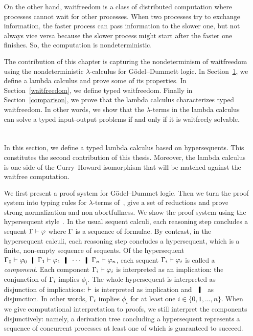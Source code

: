 On the other hand, waitfreedom is a class of distributed computation
where processes cannot wait for other processes.  When two processes try
to exchange information, the faster process can pass information to the
slower one, but not always vice versa because the slower process might
start after the faster one finishes.
So, the computation is nondeterministic.

The contribution of this chapter is capturing
the nondeterminism of waitfreedom using the nondeterministic
$\lambda$-calculus for G\"odel--Dummett logic.
In Section~\ref{lgd},
we define a lambda calculus and prove some of its properties.
In Section~\ref{waitfreedom}, we define typed waitfreedom.
Finally in Section~\ref{comparison},
we prove that the lambda calculus characterizes typed waitfreedom.
In other words, we show that the
$\lambda$-terms in the lambda calculus can solve a typed input-output
problems if and only if it is waitfreely solvable.

\section{\lgd}
\label{lgd}

In this section, we define a typed lambda calculus based on
hypersequents.
This constitutes the second contribution of this thesis.
Moreover, the lambda calculus is one side of the Curry--Howard
isomorphism that will be matched against the waitfree computation.

We first present a proof system for G\"odel--Dummet logic.
Then we turn the proof system into typing rules for $\lambda$-terms
of~\lgd, give a set of reductions and prove strong-normalization and
non-abortfullness.
We show the proof system using the hypersequent
style~\citep{avron91}.
In the usual sequent calculi, each reasoning step concludes a sequent
$\Gamma\vdash\varphi$ where $\Gamma$ is a sequence of formulae.
By contrast,
in the hypersequent calculi, each reasoning step concludes a
hypersequent, which is a finite, non-empty sequence of sequents.
Of the hypersequent
$\G_0\vdash\phi_0\hmid\G_1\vdash\phi_1\hmid\cdots\hmid\G_n\vdash\phi_n$,
each sequent $\Gamma_i\vdash\varphi_i$ is called a
\textit{component}.
Each component $\Gamma_i\vdash\varphi_i$ is interpreted as an implication: the
conjunction of $\Gamma_i$ implies $\phi_i$.
The whole hypersequent is interpreted as disjunction of implications:
$\vdash$ is interpreted as implication and $\hmid$ as
disjunction.
In other words, $\Gamma_i$ implies $\phi_i$ for at least one $i\in
\{0,1,\ldots,n\}$.
When we give computational interpretation to proofs, we still interpret
the components
disjunctively: namely, a derivation tree concluding a hypersequent
represents a sequence of concurrent processes at least one of which is
guaranteed to succeed.

